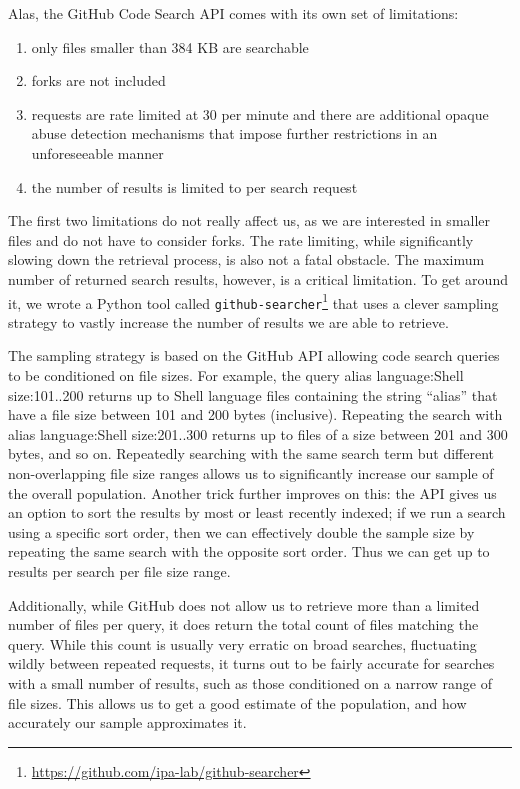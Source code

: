 \documentclass[smallextended,natbib]{svjour3}
\newcommand{\num}[1]{\numprint{#1}}
\newenvironment{CVerbatim}
  {\center\BVerbatim}
  {\endBVerbatim\endcenter}
\begin{document}
Alas, the GitHub Code Search API comes with its own set of limitations:
\begin{enumerate}
    \item only files smaller than 384 KB are searchable
    \item forks are not included
    \item requests are rate limited at 30 per minute and there are additional opaque abuse detection mechanisms that impose further restrictions in an unforeseeable manner
    \item the number of results is limited to \num{1000} per search request
\end{enumerate}
The first two limitations do not really affect us, as we are interested in smaller files and do not have to consider forks.
The rate limiting, while significantly slowing down the retrieval process, is also not a fatal obstacle.
The maximum number of returned search results, however, is a critical limitation.
To get around it, we wrote a Python tool called \verb|github-searcher|\footnote{\url{https://github.com/ipa-lab/github-searcher}} that uses a clever sampling strategy to vastly increase the number of results we are able to retrieve.

The sampling strategy is based on the GitHub API allowing code search queries to be conditioned on file sizes. 
For example, the query 
\begin{CVerbatim}
alias language:Shell size:101..200
\end{CVerbatim}
returns up to \num{1000} Shell language files containing the string ``alias'' that have a file size between 101 and 200 bytes (inclusive).
Repeating the search with 
\begin{CVerbatim}
alias language:Shell size:201..300
\end{CVerbatim}
returns up to \num{1000} files of a size between 201 and 300 bytes, and so on.
Repeatedly searching with the same search term but different non-overlapping file size ranges allows us to significantly increase our sample of the overall population.
Another trick further improves on this: 
the API gives us an option to sort the results by most or least recently indexed;
if we run a search using a specific sort order, then we can effectively double the sample size by repeating the same search with the opposite sort order.
Thus we can get up to \num{2000} results per search per file size range.

Additionally, while GitHub does not allow us to retrieve more than a limited number of files per query, it does return the total count of files matching the query.
While this count is usually very erratic on broad searches, fluctuating wildly between repeated requests, it turns out to be fairly accurate for searches with a small number of results, such as those conditioned on a narrow range of file sizes.
This allows us to get a good estimate of the population, and how accurately our sample approximates it.
\end{document}
